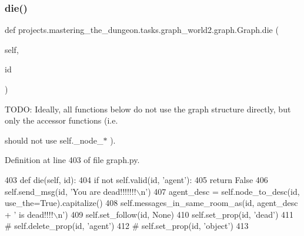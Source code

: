 \mbox{\label{classprojects_1_1mastering__the__dungeon_1_1tasks_1_1graph__world2_1_1graph_1_1Graph_aff30ced8dfe1c7910bdf511f5b7af635}} 
\subsubsection{\texorpdfstring{die()}{die()}}
{\footnotesize\ttfamily def projects.\+mastering\+\_\+the\+\_\+dungeon.\+tasks.\+graph\+\_\+world2.\+graph.\+Graph.\+die (\begin{DoxyParamCaption}\item[{}]{self,  }\item[{}]{id }\end{DoxyParamCaption})}





 T\+O\+DO\+: Ideally, all functions below do not use the graph structure directly, but only the accessor functions (i.\+e. 

should not use self.\+\_\+node\+\_\+$\ast$ ). 

Definition at line 403 of file graph.\+py.


\begin{DoxyCode}
403     \textcolor{keyword}{def }die(self, id):
404         \textcolor{keywordflow}{if} \textcolor{keywordflow}{not} self.valid(id, \textcolor{stringliteral}{'agent'}):
405             \textcolor{keywordflow}{return} \textcolor{keyword}{False}
406         self.send\_msg(id, \textcolor{stringliteral}{'You are dead!!!!!!!\(\backslash\)n'})
407         agent\_desc = self.node\_to\_desc(id, use\_the=\textcolor{keyword}{True}).capitalize()
408         self.messages\_in\_same\_room\_as(id, agent\_desc + \textcolor{stringliteral}{' is dead!!!!\(\backslash\)n'})
409         self.set\_follow(id, \textcolor{keywordtype}{None})
410         self.set\_prop(id, \textcolor{stringliteral}{'dead'})
411         \textcolor{comment}{# self.delete\_prop(id, 'agent')}
412         \textcolor{comment}{# self.set\_prop(id, 'object')}
413 
\end{DoxyCode}
\mbox{\label{classprojects_1_1mastering__the__dungeon_1_1tasks_1_1graph__world2_1_1graph_1_1Graph_a22e60e26302aae3e1c0d43f86f4c332d}} 
